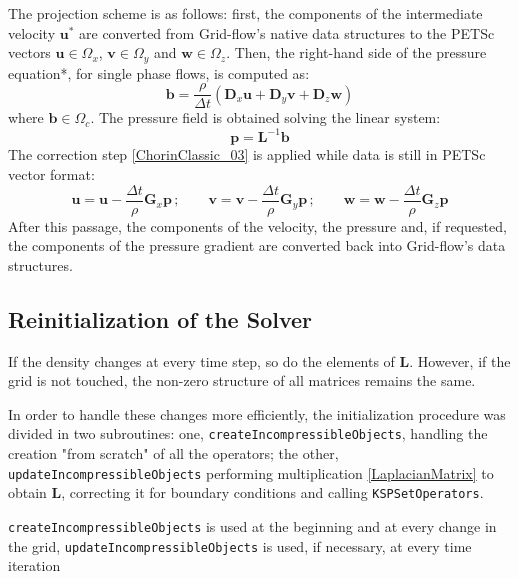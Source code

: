 \documentclass[11pt, a4paper, oneside, openany]{book}
\begin{document}
The projection scheme is as follows: first, the components of the intermediate velocity $\boldsymbol{u}^{*}$ are converted from Grid-flow's native data structures to the  PETSc vectors $\boldsymbol{u}\in\Omega_{x}$, $\boldsymbol{v}\in\Omega_{y}$ and $\boldsymbol{w}\in\Omega_{z}$. Then, the right-hand side of the pressure equation*, for single phase flows, is computed as:
\begin{equation*}
\boldsymbol{b}=\dfrac{\rho}{\Delta t}\left(\boldsymbol{D}_{x}\boldsymbol{u}+\boldsymbol{D}_{y}\boldsymbol{v}+\boldsymbol{D}_{z}\boldsymbol{w}\right)\label{Right-Hand-Side}
\end{equation*}
where $\boldsymbol{b}\in\Omega_{c}$. The pressure field is obtained solving the linear system:
\begin{equation*}
\boldsymbol{p}=\boldsymbol{L}^{-1}\boldsymbol{b}\label{PressureField}
\end{equation*}
The correction step \eqref{ChorinClassic_03} is applied while data is still in PETSc vector format:
\begin{equation*}
\boldsymbol{u}=\boldsymbol{u}-\dfrac{\Delta t}{\rho}\boldsymbol{G}_{x}\boldsymbol{p}\,;\qquad\boldsymbol{v}=\boldsymbol{v}-\dfrac{\Delta t}{\rho}\boldsymbol{G}_{y}\boldsymbol{p}\,;\qquad\boldsymbol{w}=\boldsymbol{w}-\dfrac{\Delta t}{\rho}\boldsymbol{G}_{z}\boldsymbol{p}
\end{equation*}
After this passage, the components of the velocity, the pressure and, if requested, the components of the pressure gradient are converted back into Grid-flow's data structures.
\subsection{Reinitialization of the Solver}\label{Subsection_Reinitialization_of_the_Solver}
If the density changes at every time step, so do the elements of $\boldsymbol{L}$. However, if the grid is not touched, the non-zero structure of all matrices remains the same.\par
In order to handle these changes more efficiently, the initialization procedure was divided in two subroutines: one, \texttt{\small createIncompressibleObjects}, handling the creation "from scratch" of all the operators; the other, \texttt{\small updateIncompressibleObjects} performing multiplication \eqref{LaplacianMatrix} to obtain $\boldsymbol{L}$, correcting it for boundary conditions and calling \texttt{\small KSPSetOperators}.\par
\texttt{\small createIncompressibleObjects} is used at the beginning and at every change in the grid, \texttt{\small updateIncompressibleObjects} is used, if necessary, at every time iteration
\end{document}
